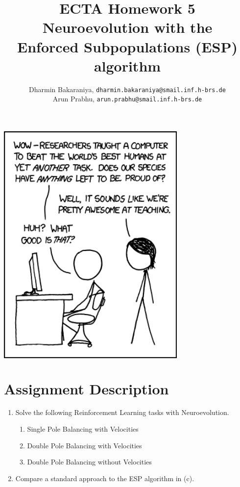 \documentclass{article}
\title{ECTA Homework 5\\Neuroevolution with the\\Enforced Subpopulations (ESP) algorithm}
\author{\color{blue}Dharmin Bakaraniya, \texttt{dharmin.bakaraniya@smail.inf.h-brs.de}\\
\color{blue}Arun Prabhu, \texttt{arun.prabhu@smail.inf.h-brs.de}}
\begin{document}
\maketitle

\begin{center}
	\begin{minipage}{1\linewidth}
		\begin{center}
			\includegraphics[width=0.7\textwidth]{progeny}
		\end{center}
	\end{minipage}
\end{center}

\newpage

\section{Assignment Description}
	\begin{enumerate}
		\item Solve the following Reinforcement Learning tasks with Neuroevolution.
			\begin{enumerate}
			\item Single Pole Balancing with Velocities
			\item Double Pole Balancing with Velocities
			\item Double Pole Balancing without Velocities
		\end{enumerate}
		\item Compare a standard approach to the ESP algorithm in (c).
	\end{enumerate}
\end{document}
